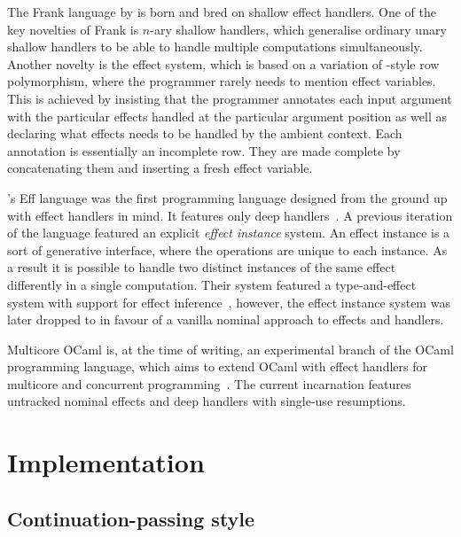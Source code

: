 \documentclass[12pt,phd,lfcs,twoside,openright,logo,leftchapter,normalheadings]{infthesis}
\theoremstyle{plain}
\theoremstyle{definition}
\begin{document}
The Frank language by \citet{LindleyMM17} is born and bred on shallow
effect handlers. One of the key novelties of Frank is $n$-ary shallow
handlers, which generalise ordinary unary shallow handlers to be able
to handle multiple computations simultaneously. Another novelty is the
effect system, which is based on a variation of
\citeauthor{Leijen05}-style row polymorphism, where the programmer
rarely needs to mention effect variables. This is achieved by
insisting that the programmer annotates each input argument with the
particular effects handled at the particular argument position as well
as declaring what effects needs to be handled by the ambient
context. Each annotation is essentially an incomplete row. They are
made complete by concatenating them and inserting a fresh effect
variable.

\citeauthor{BauerP15}'s Eff language was the first programming
language designed from the ground up with effect handlers in mind. It
features only deep handlers~\cite{BauerP15}. A previous iteration of
the language featured an explicit \emph{effect instance} system. An
effect instance is a sort of generative interface, where the
operations are unique to each instance. As a result it is possible to
handle two distinct instances of the same effect differently in a
single computation. Their system featured a type-and-effect system
with support for effect inference~\cite{Pretnar13,BauerP13}, however,
the effect instance system was later dropped to in favour of a vanilla
nominal approach to effects and handlers.

Multicore OCaml is, at the time of writing, an experimental branch of
the OCaml programming language, which aims to extend OCaml with effect
handlers for multicore and concurrent
programming~\cite{DolanWM14,DolanWSYM15}. The current incarnation
features untracked nominal effects and deep handlers with single-use
resumptions.

\part{Implementation}
\label{p:implementation}

\chapter{Continuation-passing style}
\label{ch:cps}
\end{document}
